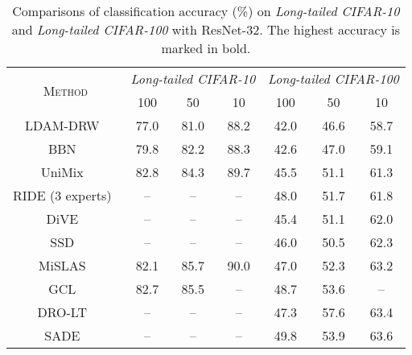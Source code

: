 \documentclass[10pt,journal,compsoc]{IEEEtran}
\begin{document}
\begin{table*}[t]
\centering
\small
\renewcommand\arraystretch{1.1}
\setlength{\tabcolsep}{13.5pt}
\caption{\small Comparisons of classification accuracy (\%) on \emph{Long-tailed CIFAR-10} and \emph{Long-tailed CIFAR-100} with ResNet-32. The highest accuracy is marked in bold.}
\begin{tabular}{c|ccc|ccc}
\toprule
\multirow{2}{*}{\textsc{Method}}           & \multicolumn{3}{c|}{\emph{Long-tailed CIFAR-10}} & \multicolumn{3}{c}{\emph{Long-tailed CIFAR-100}} \\
                                           & 100            & 50             & 10            & 100            & 50             & 10             \\
\hline
LDAM-DRW~\cite{ldam}                       & 77.0           & 81.0           & 88.2          & 42.0           & 46.6           & 58.7 \bigstrut[t] \\
BBN~\cite{bbn}                             & 79.8           & 82.2           & 88.3          & 42.6           & 47.0           & 59.1           \\
UniMix~\cite{xu2021towards}                & 82.8           & 84.3           & 89.7          & 45.5           & 51.1           & 61.3           \\
RIDE (3 experts)~\cite{wang2021longtailed} & --             & --             & --            & 48.0           & 51.7           & 61.8           \\
DiVE~\cite{He_2021_ICCV}                   & --             & --             & --            & 45.4           & 51.1           & 62.0           \\
SSD~\cite{li2021self}                      & --             & --             & --            & 46.0           & 50.5           & 62.3           \\
MiSLAS~\cite{calibrationcvpr2021}          & 82.1           & 85.7           & 90.0          & 47.0           & 52.3           & 63.2           \\
GCL~\cite{GCLcvpr22}                       & 82.7           & 85.5           & --            & 48.7           & 53.6           & --             \\
DRO-LT~\cite{Samuel_2021_ICCV}             & --             & --             & --            & 47.3           & 57.6           & 63.4           \\
SADE~\cite{SADEnips22}                     & --             & --             & --            & 49.8           & 53.9           & 63.6           \\

\end{tabular}
\end{table*}
\end{document}

